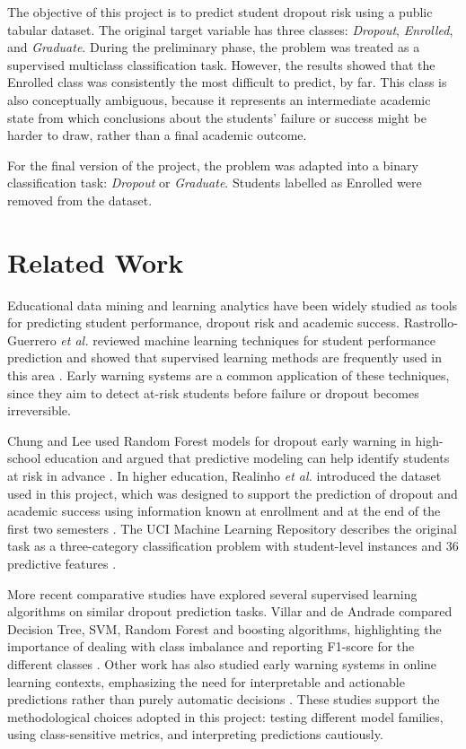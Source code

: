 \documentclass[lettersize,journal]{IEEEtran}
\begin{document}
The objective of this project is to predict student dropout risk using a public tabular dataset. The original target variable has three classes: 
\emph{Dropout}, \emph{Enrolled}, and \emph{Graduate}. During the preliminary phase, the problem was treated as a supervised multiclass classification 
task. However, the results showed that the Enrolled class was consistently the most difficult to predict, by far. 
This class is also conceptually ambiguous, because it represents an intermediate academic state from which conclusions about the students' failure or 
success might be harder to draw, rather than a final academic outcome.

For the final version of the project, the problem was adapted into a binary classification task: \emph{Dropout} or \emph{Graduate}. 
Students labelled as Enrolled were removed from the dataset.

\section{Related Work}
Educational data mining and learning analytics have been widely studied as tools for predicting student performance, dropout risk and academic success. 
Rastrollo-Guerrero \emph{et al.} reviewed machine learning techniques for student performance prediction and showed that supervised learning methods are 
frequently used in this area \cite{rastrollo2020review}. Early warning systems are a common application of these techniques, since they aim to 
detect at-risk students before failure or dropout becomes irreversible.

Chung and Lee used Random Forest models for dropout early warning in high-school education and argued that predictive modeling can help identify students 
at risk in advance \cite{chung2019dropout}. In higher education, Realinho \emph{et al.} introduced the dataset used in this project, which was designed 
to support the prediction of dropout and academic success using information known at enrollment and at the end of the first two 
semesters \cite{realinho2022dataset}. The UCI Machine Learning Repository describes the original task as a three-category classification problem with 
student-level instances and 36 predictive features \cite{uci2021dropout}.

More recent comparative studies have explored several supervised learning algorithms on similar dropout prediction tasks. Villar and de Andrade compared 
Decision Tree, SVM, Random Forest and boosting algorithms, highlighting the importance of dealing with class imbalance and reporting F1-score for the 
different classes \cite{villar2024supervised}. Other work has also studied early warning systems in online learning contexts, emphasizing the need for 
interpretable and actionable predictions rather than purely automatic decisions \cite{baneres2023early}. These studies support the methodological 
choices adopted in this project: testing different model families, using class-sensitive metrics, and interpreting predictions cautiously.
\end{document}
